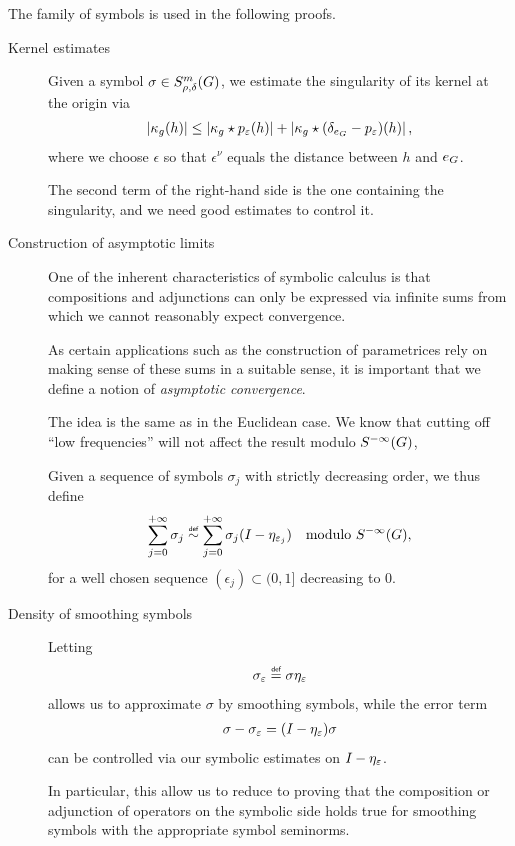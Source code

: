 The family of symbols is used in the following proofs.
\begin{description}
    \item[Kernel estimates]

        Given a symbol $\sigma \in S^{m}_{\rho, \delta}(G)$,
        we estimate the singularity of its kernel at the origin via
        \begin{align*}
            \left|{\kappa_g(h)}\right|
            \leq
            \left|{\kappa_g \star p_\varepsilon(h)}\right|
            +
            \left|{\kappa_g \star (\delta_{e_G} - p_\varepsilon)(h)}\right|,
        \end{align*}
        where we choose $\epsilon$ so that $\epsilon^\nu$ equals the distance between $h$ and $e_G$.

        The second term of the right-hand side is the one containing the singularity,
        and we need good estimates to control it.

    \item[Construction of asymptotic limits]

        One of the inherent characteristics of symbolic calculus is that compositions and adjunctions can only be expressed via infinite sums from which we cannot reasonably expect convergence.

        As certain applications such as the construction of parametrices rely on making sense of these sums in a suitable sense,
        it is important that we define a notion of \emph{asymptotic convergence}.

        The idea is the same as in the Euclidean case.
        We know that cutting off ``low frequencies'' will not affect the result modulo ${S^{-\infty} (G)}$,

        Given a sequence of symbols $\sigma_j$ with strictly decreasing order,
        we thus define
        \begin{align*}
            \sum_{j = 0}^{+\infty} \sigma_j \defsim
            \sum_{j = 0}^{+\infty} \sigma_j (\Id {} - \eta_{\epsilon_j})
            \quad \text{modulo } \SmoothingSymbols,
        \end{align*}
        for a well chosen sequence $(\epsilon_j) \subset (0, 1]$ decreasing to $0$.

    \item[Density of smoothing symbols]

        Letting
        \begin{align*}
            \sigma_\epsilon \defeq \sigma \eta_\epsilon
        \end{align*}
        allows us to approximate $\sigma$ by smoothing symbols,
        while the error term
        \begin{align*}
            \sigma - \sigma_\varepsilon = ({I_{}} - \eta_\varepsilon) \sigma
        \end{align*}
        can be controlled via our symbolic estimates on ${I_{}} - \eta_\varepsilon$.

        In particular,
        this allow us to reduce to proving that the composition or adjunction of operators on the symbolic side
        holds true for smoothing symbols with the appropriate symbol seminorms.
\end{description}

